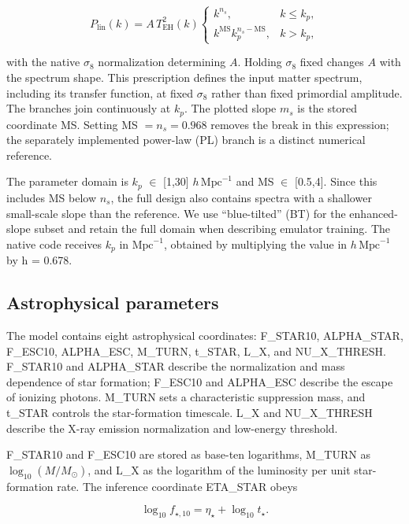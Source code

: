 \[
P_{\mathrm{lin}}(k)=A\,T_{\mathrm{EH}}^2(k)
\begin{cases}
k^{n_s}, & k\leq k_p,\\
k^{\mathrm{MS}}k_p^{n_s-\mathrm{MS}}, & k>k_p,
\end{cases}
\]

with the native $\sigma_8$ normalization determining $A$. Holding $\sigma_8$ fixed changes $A$ with the spectrum shape. This prescription defines the input matter spectrum, including its transfer function, at fixed $\sigma_8$ rather than fixed primordial amplitude. The branches join continuously at \ensuremath{k_p}. The plotted slope $m_s$ is the stored coordinate MS. Setting MS $=n_s=0.968$ removes the break in this expression; the separately implemented power-law (PL) branch is a distinct numerical reference.

The parameter domain is \ensuremath{k_p} \(\in\) {[}1,30{]} $h\,\mathrm{Mpc}^{-1}$ and MS \(\in\) {[}0.5,4{]}. Since this includes MS below $n_s$, the full design also contains spectra with a shallower small-scale slope than the reference. We use ``blue-tilted'' (BT) for the enhanced-slope subset and retain the full domain when describing emulator training. The native code receives \ensuremath{k_p} in $\mathrm{Mpc}^{-1}$, obtained by multiplying the value in $h\,\mathrm{Mpc}^{-1}$ by h = 0.678.

\subsection{Astrophysical parameters}\label{astrophysical-parameters}

The model contains eight astrophysical coordinates: F\_STAR10, ALPHA\_STAR, F\_ESC10, ALPHA\_ESC, M\_TURN, t\_STAR, L\_X, and NU\_X\_THRESH. F\_STAR10 and ALPHA\_STAR describe the normalization and mass dependence of star formation; F\_ESC10 and ALPHA\_ESC describe the escape of ionizing photons. M\_TURN sets a characteristic suppression mass, and t\_STAR controls the star-formation timescale. L\_X and NU\_X\_THRESH describe the X-ray emission normalization and low-energy threshold.

F\_STAR10 and F\_ESC10 are stored as base-ten logarithms, M\_TURN as $\log_{10}(M/M_\odot)$, and L\_X as the logarithm of the luminosity per unit star-formation rate. The inference coordinate ETA\_STAR obeys

\begin{equation}\log_{10}f_{\star,10}=\eta_\star+\log_{10}t_\star.\end{equation}

